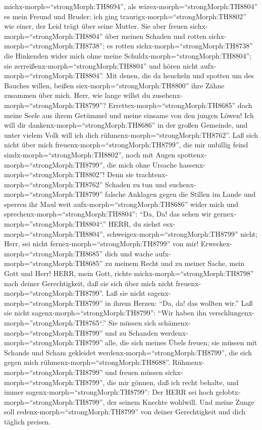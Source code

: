 michx-morph=``strongMorph:TH8694'', als
wärex-morph=``strongMorph:TH8804'' es mein Freund und Bruder; ich ging
traurigx-morph=``strongMorph:TH8802'' wie einer, der Leid trägt über
seine Mutter.  Sie aber freuen
sichx-morph=``strongMorph:TH8804'' über meinen Schaden und rotten
sichx-morph=``strongMorph:TH8738''; es rotten
sichx-morph=``strongMorph:TH8738'' die Hinkenden wider mich ohne meine
Schuldx-morph=``strongMorph:TH8804''; sie
zerreißenx-morph=``strongMorph:TH8804'' und hören nicht
aufx-morph=``strongMorph:TH8804''.  Mit denen, die da
heucheln und spotten um des Bauches willen, beißen
siex-morph=``strongMorph:TH8800'' ihre Zähne zusammen über mich.
 Herr, wie lange willst du
zusehenx-morph=``strongMorph:TH8799''?
Errettex-morph=``strongMorph:TH8685'' doch meine Seele aus ihrem
Getümmel und meine einsame von den jungen Löwen!  Ich will
dir dankenx-morph=``strongMorph:TH8686'' in der großen Gemeinde, und
unter vielem Volk will ich dich rühmenx-morph=``strongMorph:TH8762''.
 Laß sich nicht über mich
freuenx-morph=``strongMorph:TH8799'', die mir unbillig feind
sindx-morph=``strongMorph:TH8802'', noch mit Augen
spottenx-morph=``strongMorph:TH8799'', die mich ohne Ursache
hassenx-morph=``strongMorph:TH8802''!  Denn sie
trachtenx-morph=``strongMorph:TH8762'' Schaden zu tun und
suchenx-morph=``strongMorph:TH8799'' falsche Anklagen gegen die Stillen
im Lande  und sperren ihr Maul weit
aufx-morph=``strongMorph:TH8686'' wider mich und
sprechenx-morph=``strongMorph:TH8804'': ``Da, Da! das sehen wir
gernex-morph=''strongMorph:TH8804``.''  HERR, du siehst
esx-morph=``strongMorph:TH8804'', schweigex-morph=``strongMorph:TH8799''
nicht; Herr, sei nicht fernex-morph=``strongMorph:TH8799'' von mir!
 Erweckex-morph=``strongMorph:TH8685'' dich und wache
aufx-morph=``strongMorph:TH8685'' zu meinem Recht und zu meiner Sache,
mein Gott und Herr!  HERR, mein Gott, richte
michx-morph=``strongMorph:TH8798'' nach deiner Gerechtigkeit, daß sie
sich über mich nicht freuenx-morph=``strongMorph:TH8799''. 
Laß sie nicht sagenx-morph=``strongMorph:TH8799'' in ihrem Herzen: ``Da,
da! das wollten wir.'' Laß sie nicht
sagenx-morph=``strongMorph:TH8799'': ``Wir haben ihn
verschlungenx-morph=''strongMorph:TH8765``.''  Sie müssen
sich schämenx-morph=``strongMorph:TH8799'' und zu Schanden
werdenx-morph=``strongMorph:TH8799'' alle, die sich meines Übels freuen;
sie müssen mit Schande und Scham gekleidet
werdenx-morph=``strongMorph:TH8799'', die sich gegen mich
rühmenx-morph=``strongMorph:TH8688''. 
Rühmenx-morph=``strongMorph:TH8799'' und freuen müssen
sichx-morph=``strongMorph:TH8799'', die mir gönnen, daß ich recht
behalte, und immer sagenx-morph=``strongMorph:TH8799'': Der HERR sei
hoch gelobtx-morph=``strongMorph:TH8799'', der seinem Knechte wohlwill.
 Und meine Zunge soll redenx-morph=``strongMorph:TH8799''
von deiner Gerechtigkeit und dich täglich preisen.

